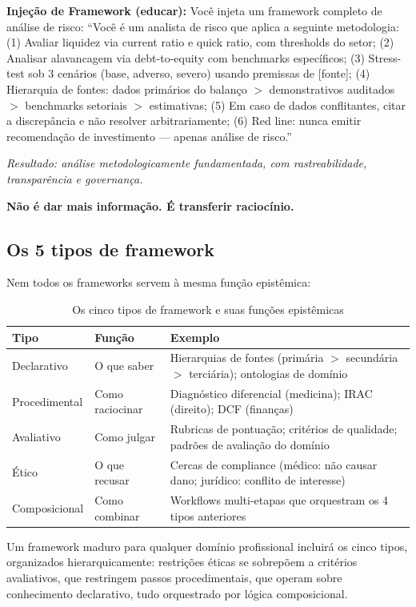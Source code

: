 \documentclass[12pt,a4paper]{article}
\begin{document}
\textbf{Injeção de Framework (educar):} Você injeta um framework completo de análise de risco: ``Você é um analista de risco que aplica a seguinte metodologia: (1) Avaliar liquidez via current ratio e quick ratio, com thresholds do setor; (2) Analisar alavancagem via debt-to-equity com benchmarks específicos; (3) Stress-test sob 3 cenários (base, adverso, severo) usando premissas de [fonte]; (4) Hierarquia de fontes: dados primários do balanço $>$ demonstrativos auditados $>$ benchmarks setoriais $>$ estimativas; (5) Em caso de dados conflitantes, citar a discrepância e não resolver arbitrariamente; (6) Red line: nunca emitir recomendação de investimento --- apenas análise de risco.''

\emph{Resultado: análise metodologicamente fundamentada, com rastreabilidade, transparência e governança.}

\textbf{Não é dar mais informação. É transferir raciocínio.}

\subsection{Os 5 tipos de framework}

Nem todos os frameworks servem à mesma função epistêmica:

\begin{table}[htbp]
\centering
\small
\caption{Os cinco tipos de framework e suas funções epistêmicas}
\label{tab:tipos-framework}
\begin{tabular}{l l p{7.5cm}}
\toprule
\textbf{Tipo} & \textbf{Função} & \textbf{Exemplo} \\
\midrule
Declarativo & O que saber & Hierarquias de fontes (primária $>$ secundária $>$ terciária); ontologias de domínio \\
Procedimental & Como raciocinar & Diagnóstico diferencial (medicina); IRAC (direito); DCF (finanças) \\
Avaliativo & Como julgar & Rubricas de pontuação; critérios de qualidade; padrões de avaliação do domínio \\
Ético & O que recusar & Cercas de compliance (médico: não causar dano; jurídico: conflito de interesse) \\
Composicional & Como combinar & Workflows multi-etapas que orquestram os 4 tipos anteriores \\
\bottomrule
\end{tabular}
\end{table}

Um framework maduro para qualquer domínio profissional incluirá os cinco tipos, organizados hierarquicamente: restrições éticas se sobrepõem a critérios avaliativos, que restringem passos procedimentais, que operam sobre conhecimento declarativo, tudo orquestrado por lógica composicional.
\end{document}
